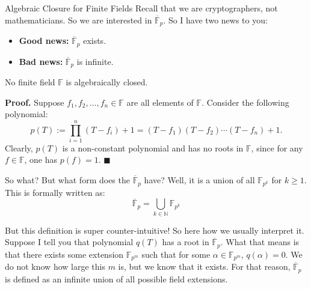 \documentclass{zkdl-presentation-template}
\begin{document}
    \begin{frame}{Algebraic Closure for Finite Fields}
        Recall that we are cryptographers, not mathematicians. So we are interested in $\overline{\mathbb{F}}_p$. So I have two news to you:\pause
        \begin{itemize}
            \item \textcolor{oc-green-7}{\textbf{Good news:}} $\overline{\mathbb{F}}_p$ exists.\pause
            \item \textcolor{oc-red-7}{\textbf{Bad news:}} $\overline{\mathbb{F}}_p$ is infinite.\pause
        \end{itemize}

        \begin{theorem}
            No finite field $\mathbb{F}$ is algebraically closed.\pause
        \end{theorem}

        \textbf{Proof.} Suppose $f_1,f_2,\dots,f_n \in \mathbb{F}$ are all elements of $\mathbb{F}$. Consider the following polynomial:
        \begin{equation*}
            p(T) := \prod_{i=1}^n (T-f_i)+1 = (T-f_1)(T-f_2)\cdots(T-f_n)+1.
        \end{equation*}
        \pause Clearly, $p(T)$ is a non-constant polynomial and has no roots in $\mathbb{F}$, since for any $f \in \mathbb{F}$, one has $p(f)=1$. $\blacksquare$
    \end{frame}

    \begin{frame}{So what?}
        But what form does the $\overline{\mathbb{F}}_{p}$ have? Well, it is a union of all $\mathbb{F}_{p^k}$ for $k \geq 1$. This is formally written as:
        \begin{equation*}
            \boxed{\overline{\mathbb{F}}_{p} = \bigcup_{k \in \mathbb{N}} \mathbb{F}_{p^k}}
        \end{equation*}
        \pause

        \begin{remark}
            But this definition is super counter-intuitive! So here how we usually interpret it. Suppose I tell you that polynomial $q(T)$ has a root in $\overline{\mathbb{F}}_p$. What that means is that there exists some extension $\mathbb{F}_{p^m}$ such that for some $\alpha \in \mathbb{F}_{p^m}$, $q(\alpha)=0$. We do not know how large this $m$ is, but we know that it exists. For that reason, $\overline{\mathbb{F}}_p$ is defined as an infinite union of all possible field extensions.
        \end{remark}
    \end{frame}
\end{document}
